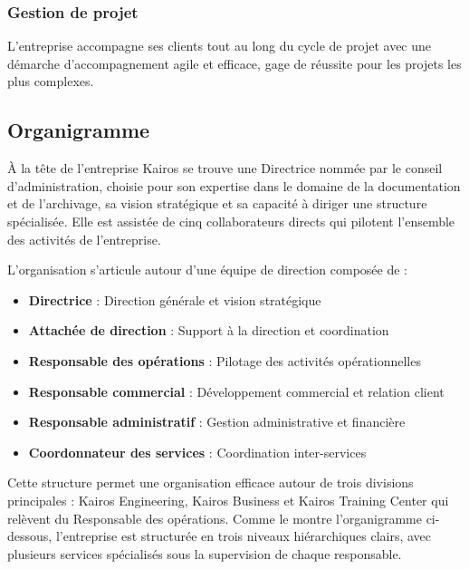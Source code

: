     \subsubsection{Gestion de projet}
    L'entreprise accompagne ses clients tout au long du cycle de projet avec une démarche d'accompagnement agile et efficace, gage de réussite pour les projets les plus complexes.
    
    \subsection{Organigramme}
    
    À la tête de l'entreprise Kairos se trouve une Directrice nommée par le conseil d'administration, choisie pour son expertise dans le domaine de la documentation et de l'archivage, sa vision stratégique et sa capacité à diriger une structure spécialisée. Elle est assistée de cinq collaborateurs directs qui pilotent l'ensemble des activités de l'entreprise.
    
    L'organisation s'articule autour d'une équipe de direction composée de :
    \begin{itemize}
        \item \textbf{Directrice} : Direction générale et vision stratégique
        \item \textbf{Attachée de direction} : Support à la direction et coordination
        \item \textbf{Responsable des opérations} : Pilotage des activités opérationnelles
        \item \textbf{Responsable commercial} : Développement commercial et relation client
        \item \textbf{Responsable administratif} : Gestion administrative et financière
        \item \textbf{Coordonnateur des services} : Coordination inter-services
    \end{itemize}
    
    Cette structure permet une organisation efficace autour de trois divisions principales : Kairos Engineering, Kairos Business et Kairos Training Center qui relèvent du Responsable des opérations. Comme le montre l'organigramme ci-dessous, l'entreprise est structurée en trois niveaux hiérarchiques clairs, avec plusieurs services spécialisés sous la supervision de chaque responsable.
    
